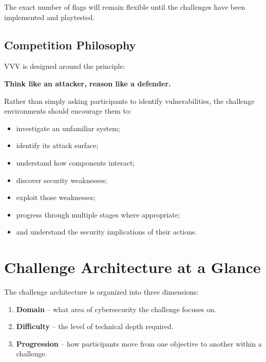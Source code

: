 \documentclass[11pt,a4paper]{article}
\begin{document}
The exact number of flags will remain flexible until the challenges
have been implemented and playtested.


\subsection{Competition Philosophy}

VVV is designed around the principle:

\begin{center}

\Large
\textbf{
Think like an attacker, reason like a defender.
}

\end{center}

Rather than simply asking participants to identify vulnerabilities,
the challenge environments should encourage them to:

\begin{itemize}

    \item investigate an unfamiliar system;

    \item identify its attack surface;

    \item understand how components interact;

    \item discover security weaknesses;

    \item exploit those weaknesses;

    \item progress through multiple stages where appropriate;

    \item and understand the security implications of their actions.

\end{itemize}



\section{Challenge Architecture at a Glance}

The challenge architecture is organized into three dimensions:

\begin{enumerate}

    \item \textbf{Domain} -- what area of cybersecurity the challenge
    focuses on.

    \item \textbf{Difficulty} -- the level of technical depth required.

    \item \textbf{Progression} -- how participants move from one
    objective to another within a challenge.

\end{enumerate}
\end{document}
